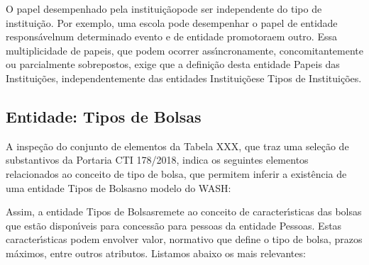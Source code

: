 \documentclass[
12pt,		%
openright,	%
twoside,  %
a4paper,			%
chapter=TITLE,		%
english,			%
french,				%
spanish,			%
brazil				%
]{USPSC-classe/USPSC}
\begin{document}
O \textquotedbl papel desempenhado pela institui\c{c}\~ao\textquotedbl  pode ser independente do \textquotedbl tipo de institui\c{c}\~ao\textquotedbl . Por exemplo, uma escola pode desempenhar o papel de \textquotedbl entidade respons\'avel\textquotedbl  num determinado evento e de \textquotedbl entidade promotora\textquotedbl  em outro. Essa multiplicidade de papeis, que podem ocorrer ass\'{\i}ncronamente, concomitantemente ou parcialmente sobrepostos, exige que a defini\c{c}\~ao desta entidade \textquotedbl Papeis das Institui\c{c}\~oes\textquotedbl , independentemente das entidades \textquotedbl Institui\c{c}\~oes\textquotedbl  e \textquotedbl Tipos de Institui\c{c}\~oes\textquotedbl .














\subsection[Entidade: Tipos de Bolsas]{Entidade: Tipos de Bolsas}\label{Entidade: Tipos de Bolsas}
A inspe\c{c}\~ao do conjunto de elementos da Tabela XXX, que traz uma sele\c{c}\~ao de substantivos da Portaria CTI 178/2018, indica os seguintes elementos relacionados ao conceito de \textquotedbl tipo de bolsa\textquotedbl , que permitem inferir a exist\^encia de uma entidade \textquotedbl Tipos de Bolsas\textquotedbl  no modelo do WASH:















\noindent\begin{center}\mbox{\centering{}}\end{center}


Assim, a entidade \textquotedbl Tipos de Bolsas\textquotedbl  remete ao conceito de caracter\'{\i}sticas das bolsas que est\~ao dispon\'{\i}veis para concess\~ao para pessoas da entidade \textquotedbl Pessoas\textquotedbl . Estas caracter\'{\i}sticas podem envolver valor, normativo que define o tipo de bolsa, prazos m\'aximos, entre outros atributos. Listamos abaixo os mais relevantes:
\end{document}
